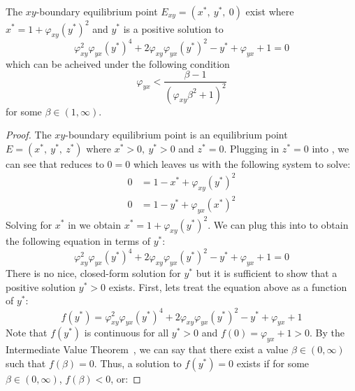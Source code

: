 \begin{theorem}\label{thm:eq-boundary-xy-exist}
    The $xy$-boundary equilibrium point $E_{xy}=\left(x^*,\ y^*,\ 0\right)$ exist where $x^*=1+\varphi_{xy}\left(y^*\right)^2$ and $y^*$ is a positive solution to
    \begin{equation*}
        \varphi_{xy}^2\varphi_{yx}\left(y^*\right)^4+2\varphi_{xy}\varphi_{yx}\left(y^*\right)^2-y^*+\varphi_{yx}+1=0
    \end{equation*}
    which can be acheived under the following condition
    \begin{equation*}
        \varphi_{yx}<\frac{\beta-1}{\left(\varphi_{xy}\beta^2+1\right)^2}
    \end{equation*}
    for some $\beta\in\left(1, \infty\right)$.
\end{theorem}
\begin{proof}
    The $xy$-boundary equilibrium point is an equilibrium point $E=\left(x^*,\ y^*,\ z^*\right)$ where $x^*>0,\ y^*>0$ and $z^*=0$. Plugging in $z^*=0$ into , we can see that  reduces to $0=0$ which leaves us with the following system to solve:
    \begin{subequations}\label{system:xy-boundary}
        \begin{align}
            0 &= 1-x^*+\varphi_{xy}\left(y^*\right)^2 \label{eq:xy-boundary-x}\\
            0 &= 1-y^*+\varphi_{yx}\left(x^*\right)^2 \label{eq:xy-boundary-y}
        \end{align}
    \end{subequations}
    Solving for $x^*$ in  we obtain $x^*=1+\varphi_{xy}\left(y^*\right)^2$. We can plug this into  to obtain the following equation in terms of $y^*$:
    \begin{equation*}
        \varphi_{xy}^2\varphi_{yx}\left(y^*\right)^4+2\varphi_{xy}\varphi_{yx}\left(y^*\right)^2-y^*+\varphi_{yx}+1=0
    \end{equation*}
    There is no nice, closed-form solution for $y^*$ but it is sufficient to show that a positive solution $y^*>0$ exists. First, lets treat the equation above as a function of $y^*$:
    \begin{equation*}
        f\left(y^*\right)=\varphi_{xy}^2\varphi_{yx}\left(y^*\right)^4+2\varphi_{xy}\varphi_{yx}\left(y^*\right)^2-y^*+\varphi_{yx}+1
    \end{equation*}
    Note that $f\left(y^*\right)$ is continuous for all $y^*>0$ and $f(0)=\varphi_{yx}+1>0$. By the Intermediate Value Theorem~\cite{STEWART9781337613927}, we can say that there exist a value $\beta\in\left(0,\infty\right)$ such that $f(\beta)=0$. Thus, a solution to $f\left(y^*\right)=0$ exists if for some $\beta\in\left(0,\infty\right)$, $f\left(\beta\right)<0$, or:

\end{proof}
